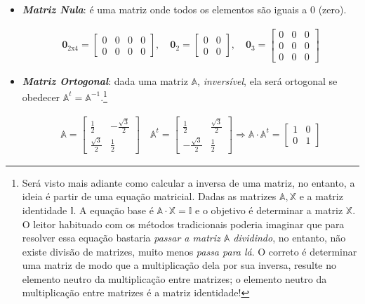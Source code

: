 \begin{itemize}
\begin{ceqn}
	\end{ceqn}
	\item \textit{\textbf{Matriz Nula}}: é uma matriz onde todos os elementos são iguais a $0$ (zero).
	\begin{ceqn}
		\begin{align*}
		\mathbf{0}_{2\mathrm{x}4}=\begin{bmatrix}0 & 0 & 0 & 0\\
		0 & 0 & 0 & 0
		\end{bmatrix},\quad\mathbf{0}_{2}=\begin{bmatrix}0 & 0\\
		0 & 0
		\end{bmatrix},\quad\mathbf{0}_{3}=\begin{bmatrix}0 & 0 & 0\\
		0 & 0 & 0\\
		0 & 0 & 0
		\end{bmatrix}
		\end{align*}
	\end{ceqn}
	\item \textit{\textbf{Matriz Ortogonal}}: dada uma matriz $\mathbb{A}$, \textit{inversível}, ela será ortogonal se obedecer $\mathbb{A}^t = \mathbb{A}^{-1}$.\footnote{Será visto mais adiante como calcular a inversa de uma matriz, no entanto, a ideia é partir de uma equação matricial. Dadas as matrizes $\mathbb{A}, \mathbb{X}$ e a matriz identidade $\mathbb{I}$. A equação base é $\mathbb{A}\cdot \mathbb{X} = \mathbb{I}$ e o objetivo é determinar a matriz $\mathbb{X}$. O leitor habituado com os métodos tradicionais poderia imaginar que para resolver essa equação bastaria \textit{passar a matriz $\mathbb{A}$ dividindo}, no entanto, não existe divisão de matrizes, muito menos \textit{passa para lá}. O correto é determinar uma matriz de modo que a multiplicação dela por sua inversa, resulte no elemento neutro da multiplicação entre matrizes; o elemento neutro da multiplicação entre matrizes é a matriz identidade!}
	\begin{ceqn}
		\begin{align*}
		\mathbb{A}=\begin{bmatrix}\frac{1}{2} & -\frac{\sqrt{3}}{2}\\
		\frac{\sqrt{3}}{2} & \frac{1}{2}
		\end{bmatrix}\quad\mathbb{A}^{t}=\begin{bmatrix}\frac{1}{2} & \frac{\sqrt{3}}{2}\\
		-\frac{\sqrt{3}}{2} & \frac{1}{2}
		\end{bmatrix}\Rightarrow\mathbb{A}\cdot\mathbb{A}^{t}=\begin{bmatrix}1 & 0\\
		0 & 1
		\end{bmatrix}
		\end{align*}
	\end{ceqn}
\end{itemize}

